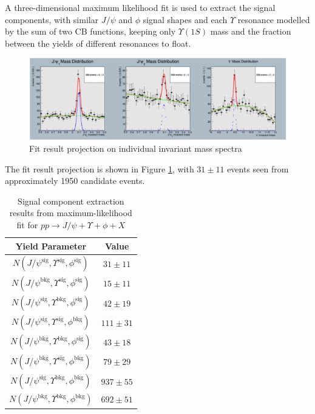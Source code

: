 \documentclass[10pt,twocolumn]{article}
\begin{document}
A three-dimensional maximum likelihood fit is used to extract the signal components, with similar $J/\psi$ and $\phi$ signal shapes and each $\Upsilon$ resonance modelled by the sum of two CB functions, keeping only $\Upsilon(1S)$ mass and the fraction between the yields of different resonances to float.

\begin{figure}[!htbp]
    \centering
    \includegraphics[width=1.0\linewidth]{images/JpsiJpsiY_fit.png}
    \caption{Fit result projection on individual invariant mass spectra}
    \label{fig:JpsiYPhi_fit}
\end{figure}

The fit result projection is shown in Figure  \ref{fig:JpsiYPhi_fit}, with $31 \pm 11$ events seen from approximately 1950 candidate events.

\begin{table}[h!]
    \centering
    \caption{Signal component extraction results from maximum-likelihood fit for $pp\to J/\psi+\Upsilon+\phi+X$\\}
    \begin{tabular}{cc}
        \toprule
        \textbf{Yield Parameter} & \textbf{Value} \\
        \midrule
        $N(J/\psi^{\text{sig}  },\Upsilon^{\text{sig} }, \phi^\text{sig})$ & $31 \pm 11$ \\
        $N(J/\psi^{\text{bkg}  },\Upsilon^{\text{sig} }, \phi^\text{sig})$ & $15 \pm 11$ \\
        $N(J/\psi^{\text{sig}  },\Upsilon^{\text{bkg} }, \phi^\text{sig})$ & $42 \pm 19$ \\
        $N(J/\psi^{\text{sig}  },\Upsilon^{\text{sig} }, \phi^\text{bkg})$ & $111 \pm 31$ \\
        $N(J/\psi^{\text{bkg}  },\Upsilon^{\text{bkg} }, \phi^\text{sig})$ & $43 \pm 18$ \\
        $N(J/\psi^{\text{bkg}  },\Upsilon^{\text{sig} }, \phi^\text{bkg})$ & $79 \pm 29$ \\
        $N(J/\psi^{\text{sig}  },\Upsilon^{\text{bkg} }, \phi^\text{bkg})$ & $937 \pm 55$ \\
        $N(J/\psi^{\text{bkg}  },\Upsilon^{\text{bkg} }, \phi^\text{bkg})$ & $692 \pm 51$ \\
        \bottomrule
    \end{tabular}
    \label{tab:fitres_JpsiYPhi}
\end{table}
\end{document}
